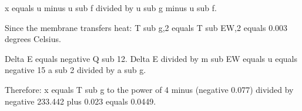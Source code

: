 x equals u minus u sub f divided by u sub g minus u sub f.  

Since the membrane transfers heat:  
T sub g,2 equals T sub EW,2 equals 0.003 degrees Celsius.  

Delta E equals negative Q sub 12.  
Delta E divided by m sub EW equals u equals negative 15 a sub 2 divided by a sub g.  

Therefore:  
x equals T sub g to the power of 4 minus (negative 0.077) divided by negative 233.442 plus 0.023 equals 0.0449.
